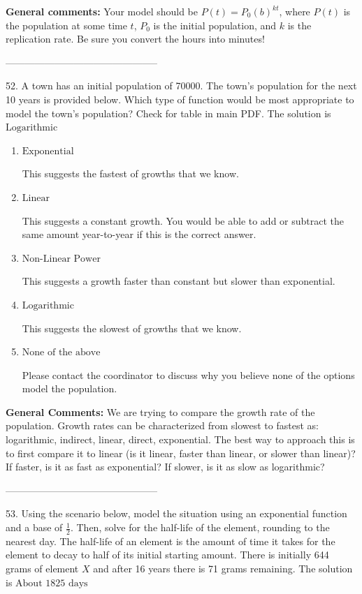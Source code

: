 \documentclass{extbook}[14pt]
\begin{document}
\textbf{General comments:} Your model should be $P(t) = P_0(b)^{kt}$, where $P(t)$ is the population at some time $t$, $P_0$ is the initial population, and $k$ is the replication rate. Be sure you convert the hours into minutes!

-----------------------------------------------

52. A town has an initial population of 70000. The town's population for the next 10 years is provided below. Which type of function would be most appropriate to model the town's population?
Check for table in main PDF. 
The solution is $ \text{Logarithmic} $ 

\begin{enumerate}[label=\Alph*.] 
\item $ \text{Exponential} $ 

 This suggests the fastest of growths that we know. 
\item $ \text{Linear} $ 

 This suggests a constant growth. You would be able to add or subtract the same amount year-to-year if this is the correct answer. 
\item $ \text{Non-Linear Power} $ 

 This suggests a growth faster than constant but slower than exponential. 
\item $ \text{Logarithmic} $ 

 This suggests the slowest of growths that we know. 
\item $ \text{None of the above} $ 

 Please contact the coordinator to discuss why you believe none of the options model the population. 
\end{enumerate} 
 
\textbf{General Comments:} We are trying to compare the growth rate of the population. Growth rates can be characterized from slowest to fastest as: logarithmic, indirect, linear, direct, exponential. The best way to approach this is to first compare it to linear (is it linear, faster than linear, or slower than linear)? If faster, is it as fast as exponential? If slower, is it as slow as logarithmic?

-----------------------------------------------

53. Using the scenario below, model the situation using an exponential function and a base of $\frac{1}{2}$. Then, solve for the half-life of the element, rounding to the nearest day.
The half-life of an element is the amount of time it takes for the element to decay to half of its initial starting amount. There is initially 644 grams of element $X$ and after 16 years there is 71 grams remaining. 
The solution is $ \text{About } 1825 \text{ days} $ 
\end{document}
